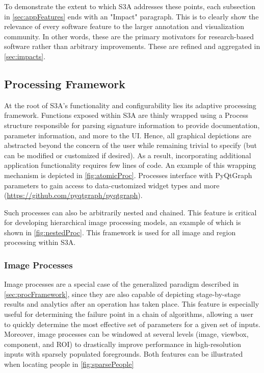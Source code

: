 To demonstrate the extent to which S3A addresses these points, each subsection in \autoref{sec:appFeatures} ends with an "Impact" paragraph. This is to clearly show the relevance of every software feature to the larger annotation and visualization community. In other words, these are the primary motivators for research-based software rather than arbitrary improvements. These are refined and aggregated in \autoref{sec:impacts}.

\subsection{Processing Framework}\label{sec:procFramework}
At the root of S3A's functionality and configurability lies its adaptive processing framework. Functions exposed within S3A are thinly wrapped using a Process structure responsible for parsing signature information to provide documentation, parameter information, and more to the UI. Hence, all graphical depictions are abstracted beyond the concern of the user while remaining trivial to specify (but can be modified or customized if desired). As a result, incorporating additional application functionality requires few lines of code. An example of this wrapping mechanism is depicted in \autoref{fig:atomicProc}. Processes interface with PyQtGraph parameters to gain access to data-customized widget types and more (\url{https://github.com/pyqtgraph/pyqtgraph}).

\makeAtomicProcFig

Such processes can also be arbitrarily nested and chained. This feature is critical for developing hierarchical image processing models, an example of which is shown in \autoref{fig:nestedProc}. This framework is used for all image and region processing within S3A.

\makeNestedProcFig

\subsubsection{Image Processes}
Image processes are a special case of the generalized paradigm described in \autoref{sec:procFramework}, since they are also capable of depicting stage-by-stage results and analytics after an operation has taken place. This feature is especially useful for determining the failure point in a chain of algorithms, allowing a user to quickly determine the most effective set of parameters for a given set of inputs. Moreover, image processes can be windowed at several levels (image, viewbox, component, and ROI) to drastically improve performance in high-resolution inputs with sparsely populated foregrounds. Both features can be illustrated when locating people in \autoref{fig:sparsePeople}

